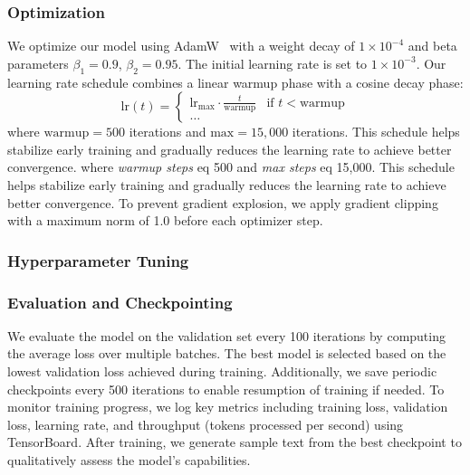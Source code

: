 \subsubsection{Optimization}
We optimize our model using AdamW~\cite{loshchilov2019decoupled} with a weight decay of $1 \times 10^{-4}$ and beta parameters $\beta_1 = 0.9$, $\beta_2 = 0.95$. The initial learning rate is set to $1 \times 10^{-3}$.
Our learning rate schedule combines a linear warmup phase with a cosine decay phase:
\begin{equation}
\text{lr}(t) =
\begin{cases}
\text{lr}_{\text{max}} \cdot \frac{t}{\text{warmup}} & \text{if } t < \text{warmup} \\
\ldots
\end{cases}
\end{equation}
\noindent where $\text{warmup} = 500$ iterations and $\text{max} = 15,000$ iterations. This schedule helps stabilize early training and gradually reduces the learning rate to achieve better convergence.
\noindent where \textit{warmup steps} eq 500 and \textit{max steps} eq 15,000. This schedule helps stabilize early training and gradually reduces the learning rate to achieve better convergence.
To prevent gradient explosion, we apply gradient clipping with a maximum norm of 1.0 before each optimizer step.
\subsubsection{Hyperparameter Tuning}

\subsubsection{Evaluation and Checkpointing}
We evaluate the model on the validation set every 100 iterations by computing the average loss over multiple batches. The best model is selected based on the lowest validation loss achieved during training. Additionally, we save periodic checkpoints every 500 iterations to enable resumption of training if needed.
To monitor training progress, we log key metrics including training loss, validation loss, learning rate, and throughput (tokens processed per second) using TensorBoard. After training, we generate sample text from the best checkpoint to qualitatively assess the model's capabilities.
